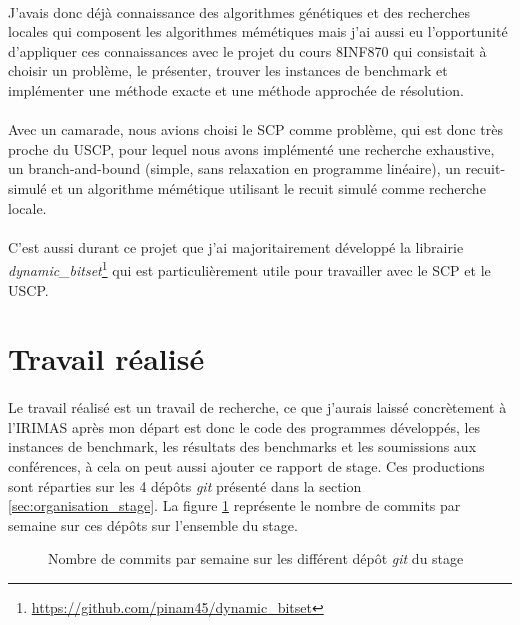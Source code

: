 \documentclass[a4paper,11pt,twoside,french,report]{../common/simplem}
\begin{document}
			\paragraph*{}
				J'avais donc déjà connaissance des algorithmes génétiques et des recherches locales qui composent les algorithmes mémétiques mais j'ai aussi eu l'opportunité d'appliquer ces connaissances avec le projet du cours \gls{8INF870} qui consistait à choisir un problème, le présenter, trouver les instances de benchmark et implémenter une méthode exacte et une méthode approchée de résolution.
			\paragraph*{}
				Avec un camarade, nous avions choisi le \gls{SCP} comme problème, qui est donc très proche du \gls{USCP}, pour lequel nous avons implémenté une recherche exhaustive, un branch-and-bound (simple, sans relaxation en programme linéaire), un recuit-simulé et un algorithme mémétique utilisant le recuit simulé comme recherche locale.~\cite{pinam452019}
			\paragraph*{}
				C'est aussi durant ce projet que j'ai majoritairement développé la librairie \textit{dynamic\_bitset}\footnote{\url{https://github.com/pinam45/dynamic_bitset}} qui est particulièrement utile pour travailler avec le \gls{SCP} et le \gls{USCP}.
		\section{Travail réalisé}\label{sec:analyse_stage_travail}
			\paragraph*{}
				Le travail réalisé est un travail de recherche, ce que j'aurais laissé concrètement à l'\gls{IRIMAS} après mon départ est donc le code des programmes développés, les instances de benchmark, les résultats des benchmarks et les soumissions aux conférences, à cela on peut aussi ajouter ce rapport de stage. Ces productions sont réparties sur les 4 dépôts \textit{git} présenté dans la section \ref{sec:organisation_stage}. La figure \ref{fig:git_commits} représente le nombre de commits par semaine sur ces dépôts sur l'ensemble du stage.
			\begin{figure}[H]
				\centering%
				\caption{Nombre de commits par semaine sur les différent dépôt \textit{git} du stage}%
				\label{fig:git_commits}%
			\end{figure}
\end{document}
